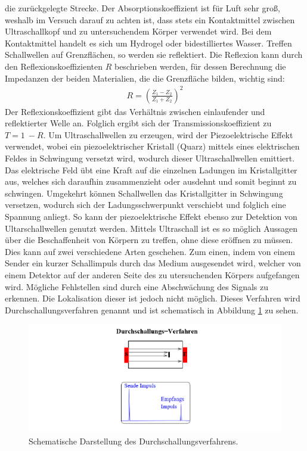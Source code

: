die zurückgelegte Strecke.
Der Absorptionskoeffizient ist für Luft sehr groß, weshalb im Versuch darauf zu achten ist, dass
stets ein Kontaktmittel zwischen Ultraschallkopf und zu untersuchendem Körper verwendet wird.
Bei dem Kontaktmittel handelt es sich um Hydrogel oder bidestilliertes Wasser.
Treffen Schallwellen auf Grenzflächen, so werden sie reflektiert. Die Reflexion kann durch den
Reflexionskoeffizienten $R$ beschrieben werden, für dessen Berechnung die Impedanzen der beiden
Materialien, die die Grenzfläche bilden, wichtig sind:
\FloatBarrier
\begin{align*}
  R = \left(\frac{Z_1 - Z_2}{Z_1 + Z_2} \right)^2
\end{align*}
\FloatBarrier
Der Reflexionskoeffizient gibt das Verhältnis zwischen einlaufender und reflektierter Welle an.
Folglich ergibt sich der Transmissionskoeffizient zu $T = 1 ~ - R$.
Um Ultraschallwellen zu erzeugen, wird der Piezoelektrische Effekt verwendet, wobei ein piezoelektrischer
Kristall (Quarz) mittels eines elektrischen Feldes in Schwingung versetzt wird, wodurch dieser
Ultraschallwellen emittiert. Das elektrische Feld übt eine Kraft auf die einzelnen Ladungen im Kristallgitter aus,
welches sich daraufhin zusammenzieht oder ausdehnt und somit beginnt zu schwingen. Umgekehrt können Schallwellen
das Kristallgitter in Schwingung versetzen, wodurch sich der Ladungsschwerpunkt verschiebt und folglich eine
Spannung anliegt. So kann der piezoelektrische Effekt ebenso zur Detektion von Ultarschallwellen genutzt werden.
Mittels Ultraschall ist es so möglich Aussagen über die Beschaffenheit von Körpern zu treffen, ohne diese eröffnen
zu müssen.
Dies kann auf zwei verschiedene Arten geschehen. Zum einen, indem von einem Sender ein kurzer Schallimpuls durch das
Medium ausgesendet wird, welcher von einem Detektor auf der anderen Seite des zu utersuchenden Körpers aufgefangen wird.
Mögliche Fehlstellen sind durch eine Abschwächung des Signals zu erkennen. Die Lokalisation dieser ist jedoch nicht möglich.
Dieses Verfahren wird Durchschallungsverfahren genannt und ist schematisch in Abbildung \ref{abb1} zu sehen.
\FloatBarrier
\begin{figure}
  \centering
  \includegraphics[scale=0.8]{1.PNG}
  \caption{Schematische Darstellung des Durchschallungsverfahrens.\cite{Q1}}
  \label{abb1}
\end{figure}
